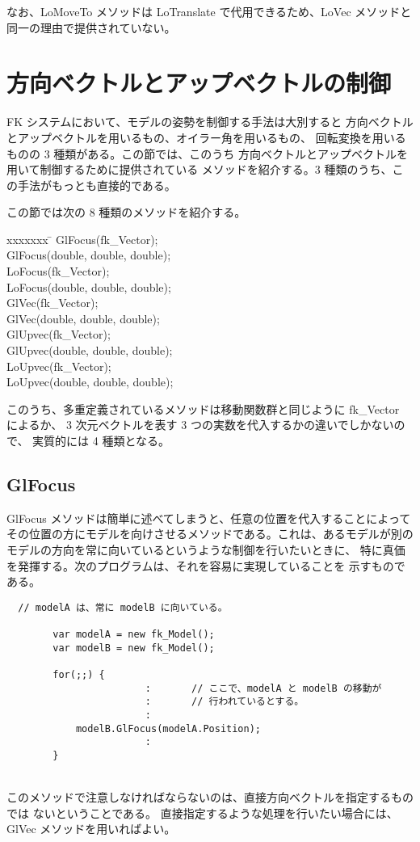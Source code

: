 なお、LoMoveTo メソッドは LoTranslate で代用できるため、LoVec メソッドと
同一の理由で提供されていない。

\section{方向ベクトルとアップベクトルの制御}
FK システムにおいて、モデルの姿勢を制御する手法は大別すると
方向ベクトルとアップベクトルを用いるもの、オイラー角を用いるもの、
回転変換を用いるものの 3 種類がある。この節では、このうち
方向ベクトルとアップベクトルを用いて制御するために提供されている
メソッドを紹介する。3 種類のうち、この手法がもっとも直接的である。

この節では次の 8 種類のメソッドを紹介する。
\begin{bf}
\begin{tabbing}
xxxxxxx \= \kill
\> GlFocus(fk\_Vector); \\
\> GlFocus(double, double, double); \\
\> LoFocus(fk\_Vector); \\
\> LoFocus(double, double, double); \\
\> GlVec(fk\_Vector); \\
\> GlVec(double, double, double); \\
\> GlUpvec(fk\_Vector); \\
\> GlUpvec(double, double, double); \\
\> LoUpvec(fk\_Vector); \\
\> LoUpvec(double, double, double); \\
\end{tabbing}
\end{bf}
このうち、多重定義されているメソッドは移動関数群と同じように fk\_Vector によるか、
3 次元ベクトルを表す 3 つの実数を代入するかの違いでしかないので、
実質的には 4 種類となる。

\subsection{GlFocus}
GlFocus メソッドは簡単に述べてしまうと、任意の位置を代入することによって
その位置の方にモデルを向けさせるメソッドである。これは、あるモデルが別の
モデルの方向を常に向いているというような制御を行いたいときに、
特に真価を発揮する。次のプログラムは、それを容易に実現していることを
示すものである。
\\
\begin{breakbox}
\begin{verbatim}
  // modelA は、常に modelB に向いている。

        var modelA = new fk_Model();
        var modelB = new fk_Model();

        for(;;) {
                        :       // ここで、modelA と modelB の移動が
                        :       // 行われているとする。
                        :
            modelB.GlFocus(modelA.Position);
                        :
        }
\end{verbatim}
\end{breakbox}
~ \\
このメソッドで注意しなければならないのは、直接方向ベクトルを指定するものでは
ないということである。
直接指定するような処理を行いたい場合には、GlVec メソッドを用いればよい。
